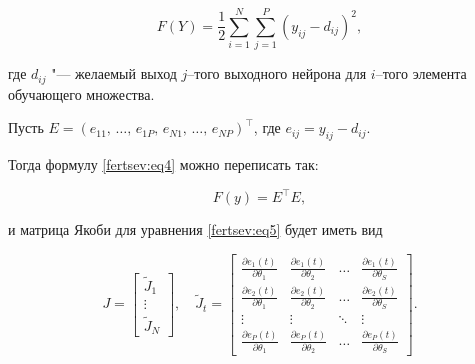 \begin{equation}

\label{fertsev:eq5}

F(Y) = \frac{1}{2}\sum^N_{i=1}\sum^P_{j=1}(y_{ij}-d_{ij})^2,

\end{equation}

где $d_{ij}$ "--- желаемый выход $j$--того выходного нейрона для $i$--того элемента обучающего множества.

Пусть $E=\left(e_{11},\,\ldots,\,e_{1P},\,e_{N1},\,\ldots,\,e_{NP}\right)^\top$, где $e_{ij}=y_{ij}-d_{ij}$.

Тогда формулу \eqref{fertsev:eq4} можно переписать так:

\[

F(y)=E^\top E,

\]

и матрица Якоби для уравнения \eqref{fertsev:eq5} будет иметь вид

\begin{equation}

\label{fertsev:eq6}

J=\begin{bmatrix}

\tilde{J}_1 \\

\vdots  \\

\tilde{J}_N

\end{bmatrix}, \quad  \tilde{J}_t= \begin{bmatrix}

\frac{\partial e_1 (t)}{\partial \theta_1} & \frac{\partial e_1(t)}{\partial \theta_2} & \ldots  & \frac{\partial e_1(t)}{\partial \theta_S} \\

\frac{\partial e_2 (t)}{\partial \theta_1} & \frac{\partial e_2(t)}{\partial \theta_2} & \ldots  & \frac{\partial e_2(t)}{\partial \theta_S} \\

\vdots  & \vdots  & \ddots  & \vdots  \\

\frac{\partial e_P(t)}{\partial \theta_1} & \frac{\partial e_P(t)}{\partial \theta_2} & \ldots  & \frac{\partial e_P(t)}{\partial \theta_S}

\end{bmatrix}.

\end{equation}

